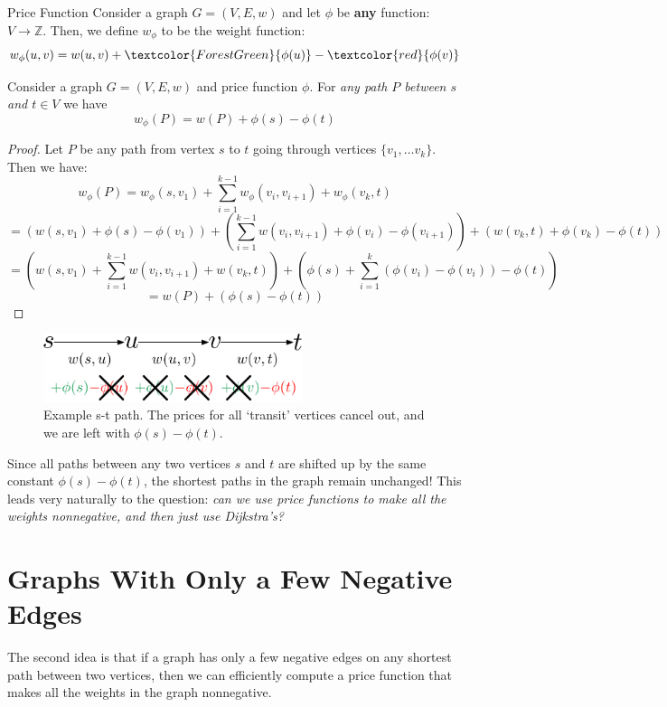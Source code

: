 \documentclass[11pt]{article}
\begin{document}
\begin{definition}{Price Function}
   Consider a graph $G = (V,E,w)$ and let $\phi$ be \textbf{any} function: $V \rightarrow \mathbb{Z}$. Then, we define $w_\phi$ to be the weight function: $$w_\phi(u,v) = w(u,v) + \textcolor{ForestGreen}{\phi(u)} - \textcolor{red}{\phi(v)}$$ %
\end{definition}

\begin{lemma}
Consider a graph $G = (V,E,w)$ and price function $\phi$. For \textit{any path $P$ between $s$ and $t \in V$} we have 
$$w_\phi(P) = w(P) + \phi(s) - \phi(t)$$
\end{lemma}

\begin{proof}
    Let $P$ be any path from vertex $s$ to $t$ going through vertices $\{v_1, \ldots v_k\}$. Then we have:
    $$w_\phi(P) = w_{\phi}(s, v_1) + \sum_{i = 1}^{k-1}w_{\phi}(v_i, v_{i + 1}) + w_{\phi}(v_k, t)$$
    $$ =  \left(w(s, v_1) + \phi(s) - \phi(v_1) \right) + \left(\sum_{i = 1}^{k-1} w(v_i, v_{i + 1}) + \phi(v_i) - \phi(v_{i + 1}) \right) + \left(w(v_k, t) + \phi(v_k) - \phi(t) \right)$$
    $$ =  \left(w(s, v_1) + \sum_{i = 1}^{k-1} w(v_i, v_{i + 1}) + w(v_k, t) \right) + \left(\phi(s) + \sum_{i = 1}^{k}(\phi(v_i) - \phi(v_i)) - \phi(t) \right)  $$
    $$ = w(P) + \left(\phi(s) - \phi(t) \right)$$
\end{proof}

\begin{figure}[ht]
    \centering
    \includegraphics[height=2cm]{images/price2.pdf}
    \caption{Example s-t path. The prices for all `transit' vertices cancel out, and we are left with $\phi(s) - \phi(t)$.}
    \label{fig:price}
\end{figure}
Since all paths between any two vertices $s$ and $t$ are shifted up by the same constant $\phi(s) - \phi(t)$, the shortest paths in the graph remain unchanged! This leads very naturally to the question: \emph{can we use price functions to make all the weights nonnegative, and then just use Dijkstra's?}
\section{Graphs With Only a Few Negative Edges}
\label{sec:fewneg}
The second idea is that if a graph has only a few negative edges on any shortest path between two vertices, then we can efficiently compute a price function that makes all the weights in the graph nonnegative.
\end{document}
